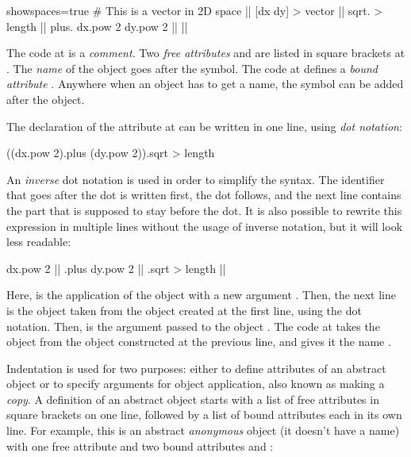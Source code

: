\begin{ffcode*}{showspaces=true}
# This is a vector in 2D space |$\label{ln:comment}$|
[dx dy] > vector |$\label{ln:vector}$|
  sqrt. > length |$\label{ln:length}$|
    plus.
      dx.pow 2
      dy.pow 2 |$\label{ln:length-end}$| |$\label{ln:vector-end}$|
\end{ffcode*}

The code at  is a \emph{comment}.
Two \emph{free attributes}  and 
are listed in square brackets at .
The \emph{name} of the object goes after the \ff{>} symbol.
The code at  defines
a \emph{bound attribute} . Anywhere when an object
has to get a name, the \ff{>} symbol can be added after the object.

The declaration of the attribute  at 
can be written in one line, using \emph{dot notation}:

\begin{ffcode}
((dx.pow 2).plus (dy.pow 2)).sqrt > length
\end{ffcode}

An \emph{inverse} dot notation is used in order to simplify
the syntax. The identifier that goes after the dot is written
first, the dot follows, and the next line contains the part
that is supposed to stay before the dot. It is also possible to rewrite
this expression in multiple lines without the usage of
inverse notation, but it will look less readable:

\begin{ffcode}
dx.pow 2 |$\label{ln:dx-pow}$|
.plus
  dy.pow 2 |$\label{ln:dx-pow-2}$|
.sqrt > length |$\label{ln:dx-pow-3}$|
\end{ffcode}

Here,  is the application of the object  with
a new argument . Then, the next line is the object  taken
from the object created at the first line, using the dot notation. Then,
 is the argument passed to the object .
The code at  takes the object  from the object constructed
at the previous line, and gives it the name .

Indentation is used for two purposes: either to define attributes
of an abstract object or to specify arguments for object application, also
known as making a \emph{copy}.
A definition of an abstract object starts with a list of free attributes
in square brackets on one line, followed by a list of bound attributes
each in its own line. For example, this is an abstract \emph{anonymous} object
(it doesn't have a name)
with one free attribute  and two bound attributes  and :

